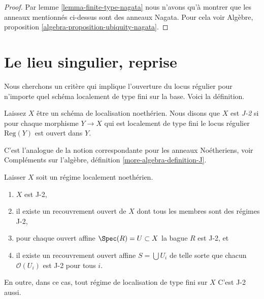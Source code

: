 \begin{proof}
Par lemme \ref{lemma-finite-type-nagata} nous n'avons qu'à montrer que les anneaux mentionnés ci-dessus sont des anneaux Nagata. Pour cela voir Algèbre, proposition \ref{algebra-proposition-ubiquity-nagata}.
\end{proof}


\section{Le lieu singulier, reprise}
\label{section-singular-locus}

\noindent
Nous cherchons un critère qui implique l'ouverture du locus régulier pour n'importe quel schéma localement de type fini sur la base. Voici la définition.

\begin{definition}

\label{definition-J}
Laissez $X$ être un schéma de localisation noethérien. Nous disons que $X$ est {\it J-2} si pour chaque morphisme $Y \to X$ qui est localement de type fini le locus régulier $\text{Reg}(Y)$ est ouvert dans $Y$.
\end{definition}

\noindent
C'est l'analogue de la notion correspondante pour les anneaux Noétheriens, voir Compléments sur l'algèbre, définition \ref{more-algebra-definition-J}.

\begin{lemma}

\label{lemma-J}

Laisser $X$ soit un régime localement noethérien.

\begin{enumerate}

\item  $X$ est J-2,
\item il existe un recouvrement ouvert de $X$ dont tous les membres sont des régimes J-2,
\item pour chaque ouvert affine $\Spec(R) = U \subset X$ la bague
$R$ est J-2, et
\item il existe un recouvrement ouvert affine $S = \bigcup U_i$ de telle sorte que chacun $\mathcal{O}(U_i)$ est J-2 pour tous $i$.

\end{enumerate}

En outre, dans ce cas, tout régime de localisation de type fini sur $X$
C'est J-2 aussi.

\end{lemma}

